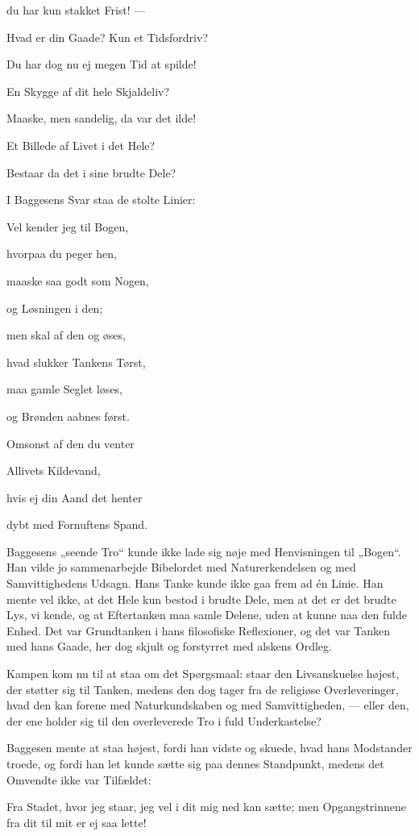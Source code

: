 \documentclass[12pt,a4paper,openany]{book}
\newcommand{\opage}[1]{\marginnote{\footnotesize\textit{[#1]}}}
\begin{document}
du har kun stakket Frist! ---

Hvad er din Gaade? Kun et Tidsfordriv?

Du har dog nu ej megen Tid at spilde!

En Skygge af dit hele Skjaldeliv?

Maaske, men sandelig, da var det ilde!

Et Billede af Livet i det Hele?

Bestaar da det i sine brudte Dele?

I Baggesens Svar staa de stolte Linier:

Vel kender jeg til Bogen,

hvorpaa du peger hen,

maaske saa godt som Nogen,

og Løsningen i den;

\setcounter{footnote}{0}%
\opage{70}men skal af den og øses,

hvad slukker Tankens Tørst,

maa gamle Seglet løses,

og Brønden aabnes først.

Omsonst af den du venter

Allivets Kildevand,

hvis ej din Aand det henter

dybt med Fornuftens Spand.

Baggesens „seende Tro“ kunde ikke lade sig nøje med Henvisningen til „Bogen“.
Han vilde jo sammenarbejde Bibelordet med Naturerkendelsen og med
Samvittighedens Udsagn. Hans Tanke kunde ikke gaa frem ad én Linie. Han mente
vel ikke, at det Hele kun bestod i brudte Dele, men at det er det brudte Lys,
vi kende, og at Eftertanken maa samle Delene, uden at kunne naa den fulde
Enhed. Det var Grundtanken i hans filosofiske Reflexioner, og det var Tanken
med hans Gaade, her dog skjult og forstyrret med alskens Ordleg.

Kampen kom nu til at staa om det Spørgsmaal: staar den Livsanskuelse højest,
der støtter sig til Tanken, medens den dog tager fra de religiøse
Overleveringer, hvad den kan forene med Naturkundskaben og med Samvittigheden,
--- eller den, der ene holder sig til den overleverede Tro i fuld Underkastelse?

Baggesen mente at staa højest, fordi han vidste og skuede, hvad hans Modstander
troede, og fordi han let kunde sætte sig paa dennes Standpunkt, medens det
Omvendte ikke var Tilfældet:

Fra Stadet, hvor jeg staar, jeg vel i dit mig ned kan sætte; men
Opgangstrinnene fra dit til mit er ej saa lette!
\end{document}
